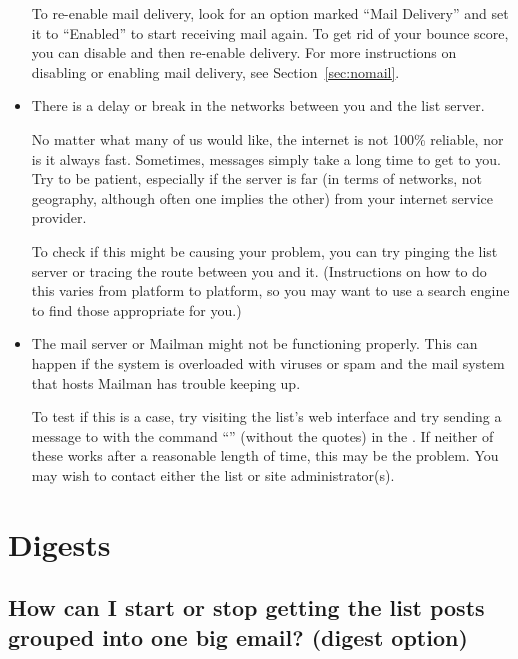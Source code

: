 \documentclass{howto}
\begin{document}
\begin{itemize}
	To re-enable mail delivery, look for an option marked ``Mail Delivery'' and
	set it to ``Enabled'' to start receiving mail again.
	To get rid of your bounce score, you can disable and then re-enable delivery.
	For more instructions on disabling or enabling mail delivery,
	see Section~\ref{sec:nomail}.




	\item There is a delay or break in the networks between you and the 
	list server.

	No matter what many of us would like, the internet is not 100\% 
	reliable, nor is it always fast.  Sometimes, messages simply take a long 
	time to get to you.  Try to be patient, especially if the server is far 
	(in terms of networks, not geography, although often one implies the other)
	from your internet service provider.

	To check if this might be causing your problem, you can try pinging
	the list server or tracing the route between you and it.  (Instructions
	on how to do this varies from platform to platform, so you may want to 
	use a search engine to find those appropriate for you.)

	\item The mail server or Mailman might not be functioning properly.  This
	can happen if the system is overloaded with viruses or spam and the mail
	system that hosts Mailman has trouble keeping up.
	
	To test if this is a case, try visiting the list's web interface and 
	try sending a message to  with the command 
	``'' (without the quotes) in the .  If 
	neither of these works after a reasonable length of time, this may be
	the problem.  You may wish to contact either the list or site 
	administrator(s).
\end{itemize}


\section{Digests}
\subsection{How can I start or stop getting the list posts grouped into one 
big email? (digest option)\label{sec:digest}}
\end{document}

